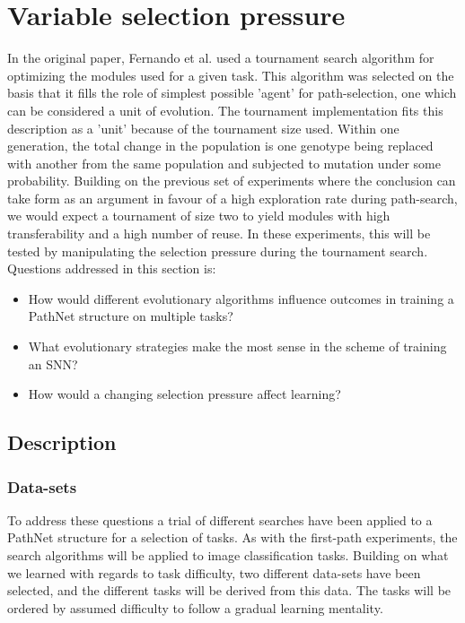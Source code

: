 \chapter{Variable selection pressure}
In the original paper, Fernando et al. used a tournament search algorithm for optimizing the modules used for a given task. This algorithm was selected on the basis that it fills the role of simplest possible 'agent' for path-selection, one which can be considered a unit of evolution.  The tournament implementation fits this description as a 'unit' because of the tournament size used. Within one generation, the total change in the population is one genotype being replaced with another from the same population and subjected to mutation under some probability. Building on the previous set of experiments where the conclusion can take form as an argument in favour of a high exploration rate during path-search, we would expect a tournament of size two to yield modules with high transferability and a high number of reuse. 
In these experiments, this will be tested by manipulating the selection pressure during the tournament search. Questions addressed in this section is: 
\begin{itemize}
    \item How would different evolutionary algorithms influence outcomes in training a PathNet structure on multiple tasks?
    \item What evolutionary strategies make the most sense in the scheme of training an SNN?
    \item How would a changing selection pressure affect learning? 
\end{itemize}

\section{Description}
\subsection{Data-sets} \label{Search-experiment:Datasets}
To address these questions a trial of different searches have been applied to a PathNet structure for a selection of tasks. As with the first-path experiments, the search algorithms will be applied to image classification tasks. Building on what we learned with regards to task difficulty, two different data-sets have been selected, and the different tasks will be derived from this data. The tasks will be ordered by assumed difficulty to follow a gradual learning mentality. 


